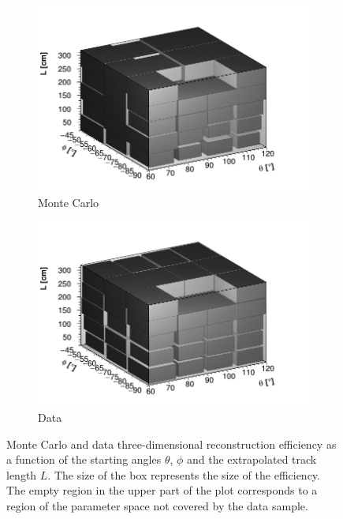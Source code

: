 \documentclass[a4paper,11pt]{article}
\begin{document}
\begin{figure}[htbp]
  \begin{subfigure}{0.52\textwidth}
    \includegraphics[width=\linewidth]{figures/3d_mc.png}
    \caption{Monte Carlo} \label{fig:3d_mc}
  \end{subfigure}
  \begin{subfigure}{0.52\textwidth}
    \includegraphics[width=\linewidth]{figures/3d_data.png}
    \caption{Data} \label{fig:3d_data}
  \end{subfigure}
  \caption{Monte Carlo and data three-dimensional reconstruction efficiency as a function of the starting angles $\theta$, $\phi$ and the extrapolated track length $L$. The size of the box represents the size of the efficiency. The empty region in the upper part of the plot corresponds to a region of the parameter space not covered by the data sample.}\label{fig:3d}
\end{figure}
\end{document}
